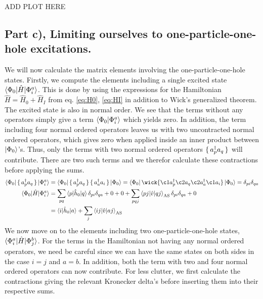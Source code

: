 \documentclass{article}
\newcommand{\gs}{\ket{\Phi_0}}
\newcommand{\inner}[3]{\braket{#1|#2|#3}}
\newcommand{\innerAS}[3]{\inner{#1}{#2}{#3}_{\text{AS}}}
\newcommand{\hnull}{\hat{h}_0}
\newcommand{\crt}[1]{a_{#1}^{\dagger}}
\newcommand{\ani}[1]{a_{#1}}
\begin{document}
    ADD PLOT HERE

\subsection*{Part c), Limiting ourselves to one-particle-one-hole excitations.}
    We will now calculate the matrix elements involving the one-particle-one-hole states. Firstly, we compute the elements including a single excited state $\inner{\Phi_0}{\hat{H}}{\Phi_i^a}$. This is done by using the expressions for the Hamiltonian $\hat{H} = \hat{H}_0 + \hat{H}_I$ from eq. \ref{eq:H0}, \ref{eq:HI} in addition to Wick's generalized theorem. The excited state is also in normal order. We see that the terms without any operators simply give a term $\braket{\Phi_0 | \Phi_{i}^{a}}$ which yields zero. In addition, the term including four normal ordered operators leaves us with two uncontracted normal ordered operators, which gives zero when applied inside an inner product between  $\gs$'s. Thus, only the terms with two normal ordered operators $\set{\crt{p}\ani{q}}$ will contribute. There are two such terms and we therefor calculate these contractions before applying the sums.  
    \begin{align*}
        \inner{\Phi_0}{\set{\crt{p}\ani{q}}}{\Phi_{i}^{a}} &= \inner{\Phi_0}{\set{\crt{p}\ani{q}} \set{\crt{a}\ani{i}}}{\Phi_0} = \bra{\Phi_0} \wick{\c1{a}^\dagger_p \c2{a}_q \c2{a}^\dagger_a \c1{\ani{i}}} \ket{\Phi_0} = \delta_{pi}\delta_{qa} \\
        \inner{\Phi_0}{\hat{H}}{\Phi_i^a} &= \sum_{pq} \inner{p}{\hnull}{q}\delta_{pi}\delta_{qa} + 0 + 0 + \sum_{pqj} \innerAS{pj}{\hat{v}}{qj}\delta_{pi}\delta_{qa} + 0 \\
        &= \inner{i}{\hnull}{a} + \sum_j \innerAS{ij}{\hat{v}}{aj}
    \end{align*}
    We now move on to the elements including two one-particle-one-hole states, $\inner{\Phi_i^a}{\hat{H}}{\Phi_j^b}$. For the terms in the Hamiltonian not having any normal ordered operators, we need be careful since we can have the same states on both sides in the case $i=j$ and $a=b$. In addition, both the term with two and four normal ordered operators can now contribute. For less clutter, we first calculate the contractions giving the relevant Kronecker delta's before inserting them into their respective sums. 
\end{document}
